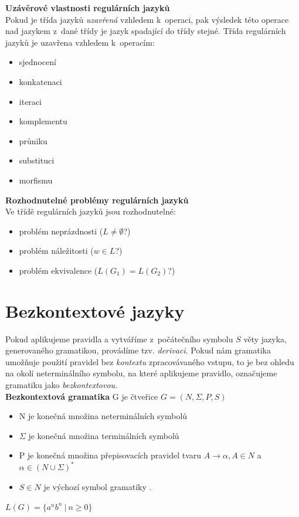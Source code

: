 \textbf{Uzávěrové vlastnosti regulárních jazyků} \\
Pokud je třída jazyků \textit{uzavřená} vzhledem k~operaci, pak výsledek této operace nad jazykem z~dané třídy je jazyk spadající do třídy stejné. 
Třída regulárních jazyků je uzavřena vzhledem k~operacím:
\begin{itemize}
\item sjednocení
\item konkatenaci
\item iteraci
\item komplementu
\item průniku
\item substituci
\item morfismu \cite[str. 77-80]{Meduna2014}
\end{itemize}
\vspace*{\baselineskip}
\textbf{Rozhodnutelné problémy regulárních jazyků} \\
Ve třídě regulárních jazyků jsou rozhodnutelné:
\begin{itemize}
\item problém neprázdnosti ($L \neq \emptyset$?)
\item problém náležitosti ($w \in L$?)
\item problém ekvivalence ($L(G_1) = L(G_2)$?) \cite[str. 52]{TIN2013}
\end{itemize}

\section{Bezkontextové jazyky} \label{sec:2:cf}
Pokud aplikujeme pravidla a vytváříme z~počátečního symbolu $S$ věty jazyka, generovaného gramatikou, provádíme tzv. \textit{derivaci}. Pokud nám 
gramatika umožňuje použití pravidel bez \textit{kontextu} zpracovávaného vstupu, to je bez ohledu na okolí neterminálního symbolu, na které aplikujeme 
pravidlo, označujeme gramatiku jako \textit{bezkontextovou}. \\

\textbf{Bezkontextová gramatika} G je čtveřice $G = (N, \Sigma, P, S)$
\begin{itemize}
\item N je konečná množina neterminálních symbolů
\item $\Sigma$ je konečná množina terminálních symbolů
\item P je konečná množina přepisovacích pravidel tvaru $A \rightarrow \alpha, A \in N$ a 
$\alpha \in (N \cup \Sigma)^*$
\item $S \in N$ je výchozí symbol gramatiky \cite[str. 55]{TIN2013}.
\end{itemize}
\vspace*{\baselineskip}
\Bat{} $L(G) = \{a^nb^n \ | \ n \geq 0\}$ \\

